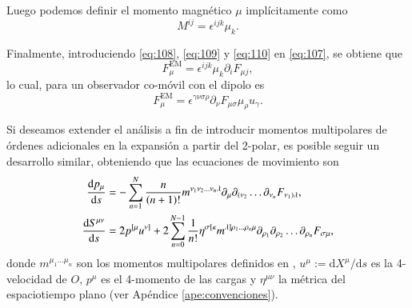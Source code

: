 Luego podemos definir el momento magnético $\mu$ implícitamente como
\begin{equation}
\label{eq:110}
M^{i j} = \epsilon^{i j k} \mu_k.
\end{equation}

Finalmente, introduciendo \eqref{eq:108}, \eqref{eq:109} y \eqref{eq:110} en \eqref{eq:107}, se obtiene que
\begin{equation}
F^{\mathrm{EM}}_{\mu} = \epsilon^{i j k} \mu_k \partial_i F_{\mu j},
\end{equation}
lo cual, para un observador co-móvil con el dipolo es
\begin{equation}
F^{\mathrm{EM}}_{\mu} = \epsilon^{\gamma \nu \sigma \rho} \partial_{\nu} F_{\mu \sigma} \mu_{\rho} u_{\gamma}.
\end{equation}

Si deseamos extender el análisis a fin de introducir momentos multipolares de órdenes adicionales en la expansión a partir del 2-polar, es posible seguir un desarrollo similar, obteniendo que las ecuaciones de movimiento son
\begin{align}
\label{eq:111}
\dv{p_{\mu}}{s} &= -\sum_{n=1}^N \frac{n}{(n+1)!} m^{\nu_1 \nu_2 \dots \nu_n \lambda} \partial_{\mu} \partial_{(\nu_2} \dots \partial_{\nu_n} F_{\nu_1) \lambda},\\
\label{eq:112}
\dv{S^{\mu \nu}}{s} &= 2 p^{[\mu} u^{\nu]} + 2 \sum_{n=0}^{N-1} \frac{1}{n!} \eta^{\sigma [\kappa} m^{\lambda] \rho_1 \dots \rho_n \mu} \partial_{\rho_1} \partial_{\rho_2} \dots \partial_{\rho_n} F_{\sigma \mu},
\end{align}
donde $m^{\mu_1 \dots \mu_n}$ son los momentos multipolares definidos en \cite{Dixon1, Dixon2, Dixon3}, $u^{\mu} := \mathrm{d} X^{\mu} / \mathrm{d}s$ es la 4-velocidad de $O$, $p^{\mu}$ es el 4-momento de las cargas y $\eta^{\mu \nu}$ la métrica del espaciotiempo plano (ver Apéndice \ref{ape:convenciones}).